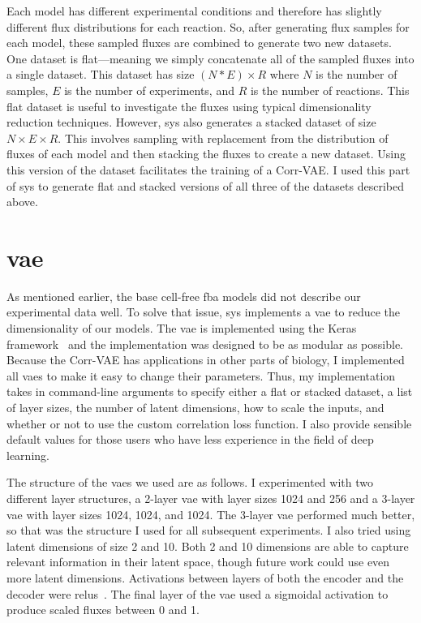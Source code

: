 Each model has different experimental conditions and therefore has slightly different flux distributions for each reaction.
So, after generating flux samples for each model, these sampled fluxes are combined to generate two new datasets.
One dataset is flat---meaning we simply concatenate all of the sampled fluxes into a single dataset.
This dataset has size $(N * E) \times R$ where $N$ is the number of samples, $E$ is the number of experiments, and $R$ is the number of reactions.
This flat dataset is useful to investigate the fluxes using typical dimensionality reduction techniques.
However, \gls{sys} also generates a stacked dataset of size $N \times E \times R$. 
This involves sampling with replacement from the distribution of fluxes of each model and then stacking the fluxes to create a new dataset.
Using this version of the dataset facilitates the training of a Corr-VAE.
I used this part of \gls{sys} to generate flat and stacked versions of all three of the datasets described above.

\section{\gls{vae}} \label{sec:vae}
As mentioned earlier, the base cell-free \gls{fba} models did not describe our experimental data well.
To solve that issue, \gls{sys} implements a \gls{vae} to reduce the dimensionality of our models.
The \gls{vae} is implemented using the Keras framework~\cite{chollet2015keras} and the implementation was designed to be as modular as possible.
Because the Corr-VAE has applications in other parts of biology, I implemented all \glspl{vae} to make it easy to change their parameters.
Thus, my implementation takes in command-line arguments to specify either a flat or stacked dataset, a list of layer sizes, the number of latent dimensions, how to scale the inputs, and whether or not to use the custom correlation loss function.
I also provide sensible default values for those users who have less experience in the field of deep learning.

The structure of the \glspl{vae} we used are as follows.
I experimented with two different layer structures, a 2-layer \gls{vae} with layer sizes 1024 and 256 and a 3-layer \gls{vae} with layer sizes 1024, 1024, and 1024.
The 3-layer \gls{vae} performed much better, so that was the structure I used for all subsequent experiments.
I also tried using latent dimensions of size 2 and 10.
Both 2 and 10 dimensions are able to capture relevant information in their latent space, though future work could use even more latent dimensions.
Activations between layers of both the encoder and the decoder were \glspl{relu}~\cite{nair2010rectified}.
The final layer of the \gls{vae} used a sigmoidal activation to produce scaled fluxes between 0 and 1.

